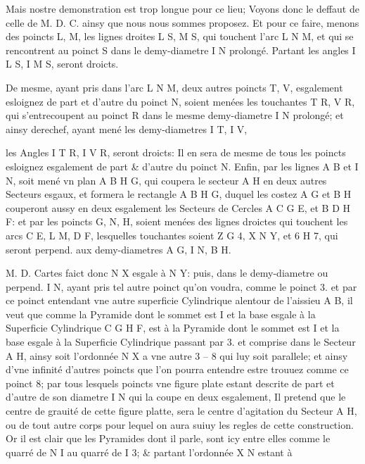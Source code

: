 \documentclass[11pt,a4paper]{article}
\begin{document}
Mais nostre demonstration est trop longue pour ce lieu; Voyons donc le deffaut de celle de M. D. C. ainsy que nous nous sommes proposez. Et pour ce faire, menons des poincts L, M, les lignes droites L S, M S, qui touchent l'arc L N M, et qui se rencontrent au poinct S dans le demy-diametre I N prolongé. Partant les angles I L S, I M S, seront droicts.

De mesme, ayant pris dans l'arc L N M, deux autres poincts T, V, esgalement esloignez de part et d'autre du poinct N, soient menées les touchantes T R, V R, qui s'entrecoupent au poinct R dans le mesme demy-diametre I N prolongé; et ainsy derechef, ayant mené les demy-diametres I T, I V,


les Angles I T R, I V R, seront droicts: Il en sera de mesme de tous les poincts esloignez esgalement de part \& d'autre du poinct N. Enfin, par les lignes A B et I N, soit mené vn plan A B H G, qui coupera le secteur A H en deux autres Secteurs esgaux, et formera le rectangle A B H G, duquel les costez A G et B H couperont aussy en deux esgalement les Secteurs de Cercles A C G E, et B D H F: et par les poincts G, N, H, soient menées des lignes droictes qui touchent les arcs C E, L M, D F, lesquelles touchantes soient Z G 4, X N Y, et 6 H 7, qui seront perpend. aux demy-diametres A G, I N, B H.

M. D. Cartes faict donc N X esgale à N Y: puis, dans le demy-diametre ou perpend. I N, ayant pris tel autre poinct qu'on voudra, comme le poinct 3. et par ce poinct entendant vne autre superficie Cylindrique alentour de l'aissieu A B, il veut que comme la Pyramide dont le sommet est I et la base esgale à la Superficie Cylindrique C G H F, est à la Pyramide dont le sommet est I et la base esgale à la Superficie Cylindrique passant par 3. et comprise dans le Secteur A H, ainsy soit l'ordonnée N X a vne autre 3 -- 8 qui luy soit parallele; et ainsy d'vne infinité d'autres poincts que l'on pourra entendre estre trouuez comme ce poinct 8; par tous lesquels poincts vne figure plate estant descrite de part et d'autre de son diametre I N qui la coupe en deux esgalement, Il pretend que le centre de grauité de cette figure platte, sera le centre d'agitation du Secteur A H, ou de tout autre corps pour lequel on aura suiuy les regles de cette construction. Or il est clair que les Pyramides dont il parle, sont icy entre elles comme le quarré de N I au quarré de I 3; \& partant l'ordonnée X N estant à
\end{document}
